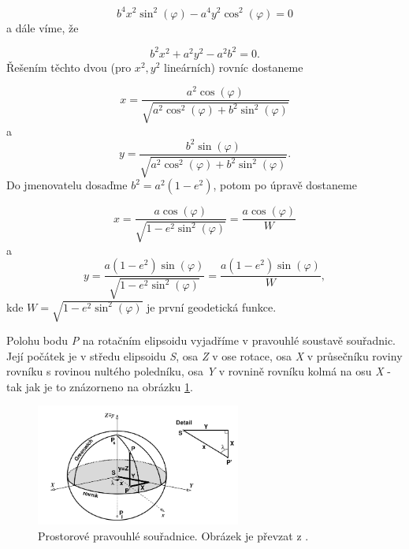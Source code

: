 \begin{equation}
b^{4}x^{2}\sin^{2}{\left(\varphi\right)} - a^{4}y^{2}\cos^{2}{\left(\varphi\right)} = 0
\end{equation}
a dále víme, že

\begin{equation}
b^{2}x^{2} + a^{2}y^{2} - a^{2}b^{2} = 0.
\end{equation}
Řešením těchto dvou (pro $x^{2}, y^{2}$ lineárních) rovníc dostaneme

\begin{equation}
x =\dfrac{a^{2}\cos{\left(\varphi\right)}}{\sqrt{a^{2}\cos^{2}{\left(\varphi\right)} + b^{2}\sin^{2}{\left(\varphi\right)}}}
\end{equation}
a
\begin{equation}
y =\dfrac{b^{2}\sin{\left(\varphi\right)}}{\sqrt{a^{2}\cos^{2}{\left(\varphi\right)} + b^{2}\sin^{2}{\left(\varphi\right)}}}.
\end{equation}
Do jmenovatelu dosaďme $b^{2} = a^{2}\left(1-e^{2}\right)$, potom po úpravě dostaneme

\begin{equation}
x =\dfrac{a\cos{\left(\varphi\right)}}{\sqrt{1-e^{2}\sin^{2}{\left(\varphi\right)}}} = \dfrac{a\cos{\left(\varphi\right)}}{W}
\label{rov:cimbX}
\end{equation}
a
\begin{equation}
y =\dfrac{a\left(1-e^{2}\right)\sin{\left(\varphi\right)}}{\sqrt{1-e^{2}\sin^{2}{\left(\varphi\right)}}} = \dfrac{a\left(1-e^{2}\right)\sin{\left(\varphi\right)}}{W},
\label{rov:cimbY}
\end{equation}
kde 
$W = \sqrt{1-e^{2}\sin^{2}{\left(\varphi\right)}}$ je první geodetická funkce.

Polohu bodu \textit{P} na rotačním elipsoidu vyjadříme v pravouhlé soustavě souřadnic. Její počátek je v středu elipsoidu \textit{S}, osa \textit{Z} v ose rotace, osa \textit{X} v průsečníku roviny rovníku s rovinou nultého poledníku, osa \textit{Y} v rovnině rovníku kolmá na osu \textit{X} - tak jak je to znázorneno na obrázku \ref{fig:cim116}.

\begin{figure}[ht!]
\begin{center}

\includegraphics[width=0.60\textwidth]{FIG/CimbalnikObr1-16}
\caption{Prostorové pravouhlé souřadnice. Obrázek je převzat z \cite{Cimbalnik1997}.}
\label{fig:cim116}
\end{center}
\end{figure}

